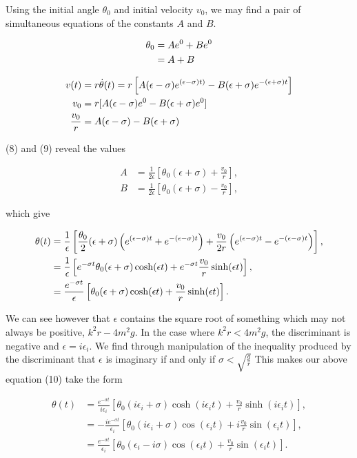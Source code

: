 \documentclass{article}
\begin{document}
Using the initial angle $\theta_0$ and initial velocity $v_0$, we may find a pair of simultaneous equations of the constants $A$ and $B$.

\begin{align}
	\theta_0 &= Ae^0 + Be^0 \notag \\
	&= A + B
\end{align}

\begin{align}
	v(t) &= r\dot{\theta}(t) = r\left[A(\epsilon - \sigma)e^{(\epsilon - \sigma)t)} - B(\epsilon + \sigma)e^{-(\epsilon + \sigma)t}\right] \notag \\
	v_0 &= r[A(\epsilon - \sigma)e^0 - B(\epsilon + \sigma)e^0] \notag \\
	\frac{v_0}{r} &= A(\epsilon - \sigma) - B(\epsilon + \sigma)
\end{align}

(8) and (9) reveal the values

\begin{align*}
	A &= \frac{1}{2\epsilon}\left[\theta_0(\epsilon + \sigma) + \frac{v_0}{r}\right], \\
	B &= \frac{1}{2\epsilon}\left[\theta_0(\epsilon + \sigma) - \frac{v_0}{r}\right],
\end{align*}

which give

\begin{align}
	\theta(t) &= \frac{1}{\epsilon}\left[\frac{\theta_0}{2}(\epsilon + \sigma)\left(e^{(\epsilon - \sigma)t} + e^{-(\epsilon - \sigma)t}\right) + \frac{v_0}{2r}\left(e^{(\epsilon - \sigma)t} - e^{-(\epsilon - \sigma)t}\right)\right], \notag \\
	&= \frac{1}{\epsilon}\left[e^{-\sigma t}\theta_0(\epsilon + \sigma)\cosh(\epsilon t) + e^{-\sigma t}\frac{v_0}{r}\sinh(\epsilon t)\right], \notag \\
	&= \frac{e^{-\sigma t}}{\epsilon}\left[\theta_0(\epsilon + \sigma)\cosh(\epsilon t) + \frac{v_0}{r}\sinh(\epsilon t)\right].
\end{align}

We can see however that $\epsilon$ contains the square root of something which may not always be positive, $k^2r-4m^2g$. In the case where $k^2r < 4m^2g$, the discriminant is negative and $\epsilon = i\epsilon_i$. We find through manipulation of the inequality produced by the discriminant that $\epsilon$ is imaginary if and only if $\sigma < \sqrt{\frac{g}{r}}$ This makes our above equation (10) take the form

\begin{align*}
	\theta(t) &= \frac{e^{-\sigma t}}{i\epsilon_i}\left[\theta_0(i\epsilon_i + \sigma)\cosh(i\epsilon_it) + \frac{v_0}{r}\sinh(i\epsilon_it)\right], \\
	&= -\frac{ie^{-\sigma t}}{\epsilon_i}\left[\theta_0(i\epsilon_i + \sigma)\cos(\epsilon_it) + i \frac{v_0}{r}\sin(\epsilon_it)\right], \\
	&= \frac{e^{-\sigma t}}{\epsilon_i}\left[\theta_0(\epsilon_i - i\sigma)\cos(\epsilon_it) + \frac{v_0}{r}\sin(\epsilon_it)\right].
\end{align*}
\end{document}
